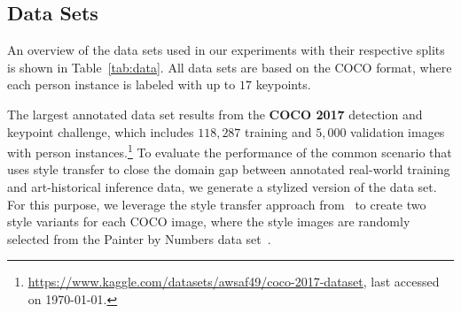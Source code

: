 \documentclass[sigconf]{acmart}
\begin{document}
\subsection{Data Sets}
\label{chp:datasets}

An overview of the data sets used in our experiments with their respective splits is shown in Table~\ref{tab:data}. 
All data sets are based on the \ac{COCO} format, where each person instance is labeled with up to $17$ keypoints.

The largest annotated data set results from the \textbf{COCO 2017} detection and keypoint challenge, which includes $118,287$ training and $5,000$ validation images with person instances.\footnote{\url{https://www.kaggle.com/datasets/awsaf49/coco-2017-dataset}, last accessed on \today.} 
To evaluate the performance of the common scenario that uses style transfer to close the domain gap between annotated real-world training and art-historical inference data, we generate a stylized version of the data set. 
For this purpose, we leverage the style transfer approach from~\citet{chen2021artistic} to create two style variants for each \ac{COCO} image, where the style images are randomly selected from the Painter by Numbers data set~\cite{painter}.
\end{document}
